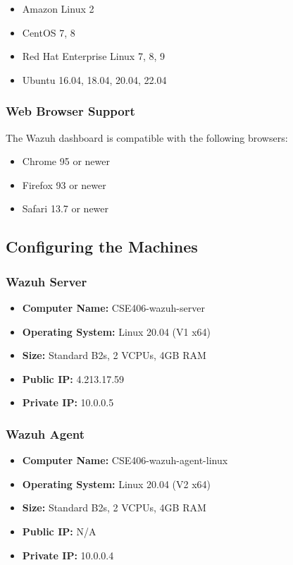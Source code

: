 \begin{itemize}
\item Amazon Linux 2
\item CentOS 7, 8
\item Red Hat Enterprise Linux 7, 8, 9
\item Ubuntu 16.04, 18.04, 20.04, 22.04
\end{itemize}

\subsubsection{Web Browser Support}

The Wazuh dashboard is compatible with the following browsers:

\begin{itemize}
\item Chrome 95 or newer
\item Firefox 93 or newer
\item Safari 13.7 or newer
\end{itemize}

\subsection{Configuring the Machines}
\subsubsection{Wazuh Server}
\begin{itemize}
    \item \textbf{Computer Name:} CSE406-wazuh-server
    \item \textbf{Operating System:} Linux 20.04 (V1 x64)
    \item \textbf{Size:} Standard B2s, 2 VCPUs, 4GB RAM
    \item \textbf{Public IP:} 4.213.17.59
    \item \textbf{Private IP:} 10.0.0.5
\end{itemize}

\subsubsection{Wazuh Agent}
\begin{itemize}
    \item \textbf{Computer Name:} CSE406-wazuh-agent-linux
    \item \textbf{Operating System:} Linux 20.04 (V2 x64)
    \item \textbf{Size:} Standard B2s, 2 VCPUs, 4GB RAM
    \item \textbf{Public IP:} N/A
    \item \textbf{Private IP:} 10.0.0.4
\end{itemize}


